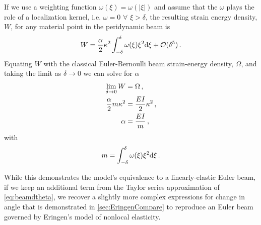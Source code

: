 %
If we use a weighting function \(\omega(\xi)=\omega(|\xi|)\) and assume that the $\omega$ plays the role of a localization kernel, i.e. $\omega = 0 \,\, \forall \,\, \xi > \delta$, the resulting strain energy density, $W$, for any material point in the peridynamic beam is
%
\begin{equation}
W = \frac{\alpha}{2}\kappa^2 \int_{-\delta}^\delta \omega(\xi)\xi^2 {\rm d}\xi + \mathcal{O}(\delta^5)\, .\notag
\end{equation}
%
Equating $W$ with the classical Euler-Bernoulli beam strain-energy density, $\Omega$, and taking the limit as $\delta \to 0$ we can solve for $\alpha$
%
\begin{align}
    \lim_{\delta \to 0}  W &= \Omega\, , \notag \\
    \frac{\alpha}{2} m \kappa^2 &= \frac{EI}{2} \kappa^2\, , \notag \\
    \alpha &= \frac{EI}{m}\, ,
\label{eq:alpha}
\end{align}
%
with 
\begin{equation}
    m = \int_{-\delta}^{\delta} \omega(\xi) \xi^2 {\rm d}\xi \notag \, .
\end{equation}

While this demonstrates the model's equivalence to a linearly-elastic Euler beam, if we keep an additional term from the Taylor series approximation of \cref{eq:beamdtheta}, we recover a slightly more complex expressions for change in angle that is demonstrated in \ref{sec:EringenCompare} to reproduce an Euler beam governed by Eringen's model of nonlocal elasticity.

